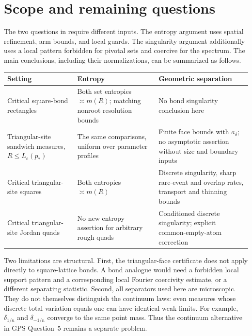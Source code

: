 \section{Scope and remaining questions}\label{sec:scope}

The two questions in \cite[Section~11]{GPS} require different inputs. The entropy argument uses spatial refinement, arm bounds, and local guards. The singularity argument additionally uses a local pattern forbidden for pivotal sets and coercive for the spectrum. The main conclusions, including their normalizations, can be summarized as follows.

\begin{center}
\small
\begin{tabularx}{\textwidth}{@{}>{\raggedright\arraybackslash}p{}>{\raggedright\arraybackslash}p{}>{\raggedright\arraybackslash}X@{}}
\hline
Setting & Entropy & Geometric separation\\
\hline
Critical square-bond rectangles & Both set entropies $\asymp m(R)$; matching nonroot resolution bounds & No bond singularity conclusion here\\[5pt]
Triangular-site sandwich measures, $R\le L_\varepsilon(p_*)$ & The same comparisons, uniform over parameter profiles & Finite face bounds with $a_\delta$; no asymptotic assertion without size and boundary inputs\\[5pt]
Critical triangular-site squares & Both entropies $\asymp m(R)$ & Discrete singularity, sharp rare-event and overlap rates, transport and thinning bounds\\[5pt]
Critical triangular-site Jordan quads & No new entropy assertion for arbitrary rough quads & Conditioned discrete singularity; explicit common-empty-atom correction\\
\hline
\end{tabularx}
\end{center}

Two limitations are structural. First, the triangular-face certificate does not apply directly to square-lattice bonds. A bond analogue would need a forbidden local support pattern and a corresponding local Fourier coercivity estimate, or a different separating statistic. Second, all separators used here are microscopic. They do not themselves distinguish the continuum laws: even measures whose discrete total variation equals one can have identical weak limits. For example, $\delta_{1/n}$ and $\delta_{-1/n}$ converge to the same point mass. Thus the continuum alternative in GPS Question~5 remains a separate problem.

